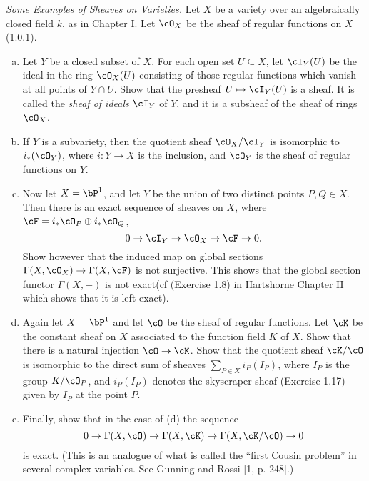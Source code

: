 \begin{homework}[e]
	 \textit{Some Examples of Sheaves on Varieties.} Let $X$ be a variety over an algebraically closed field $k$, as in Chapter I. Let $\cO_X$ be the sheaf of regular functions on $X$ (1.0.1).
	\begin{enumerate}[(a)]
		\item Let $Y$ be a closed subset of $X$. For each open set $U \subseteq X$, let $\cI_Y(U)$ be the ideal in the ring $\cO_X(U)$ consisting of those regular functions which vanish at all points of $Y \cap U$. Show that the presheaf $U \mapsto \cI_Y(U)$ is a sheaf. It is called the \textit{sheaf of ideals} $\cI_Y$ of $Y$, and it is a subsheaf of the sheaf of rings $\cO_X$.
		\item If $Y$ is a subvariety, then the quotient sheaf $\cO_X/\cI_Y$ is isomorphic to $i_*(\cO_Y)$, where $i:Y\to X$ is the inclusion, and $\cO_Y$ is the sheaf of regular functions on $Y$.
		\item Now let $X = \bP^1$, and let $Y$ be the union of two distinct points $P, Q \in X$. Then there is an exact sequence of sheaves on $X$, where $\cF = i_*\cO_P \oplus i_*\cO_Q$, \[
		0\to \cI_Y \to \cO_X \to \cF \to 0.
		\] Show however that the induced map on global sections $\Gamma(X, \cO_X) \to \Gamma(X, \cF)$ is not surjective. This shows that the global section functor $\Gamma(X, -)$ is not exact(cf (Exercise 1.8) in Hartshorne Chapter II which shows that it is left exact). 
	\item Again let $X = \bP^1$ and let $\cO$ be the sheaf of regular functions. Let $\cK$ be the constant sheaf on $X$ associated to the function field $K$ of $X$. Show that there is a natural injection $\cO\to \cK$. Show that the quotient sheaf $\cK/\cO$ is isomorphic to the direct sum of sheaves $\sum_{P\in X}i_P(I_P)$, where $I_P$ is the group $K/\cO_P$, and $i_P(I_P)$ denotes the skyscraper sheaf (Exercise 1.17) given by $I_P$ at the point $P$.
	\item Finally, show that in the case of (d) the sequence
		\[
		0\to \Gamma(X,\cO) \to \Gamma(X, \cK) \to \Gamma(X, \cK/\cO) \to 0
		\]
		is exact. (This is an analogue of what is called the ``first Cousin problem'' in several complex variables. See Gunning and Rossi [1, p. 248].)
	\end{enumerate}
\end{homework}

